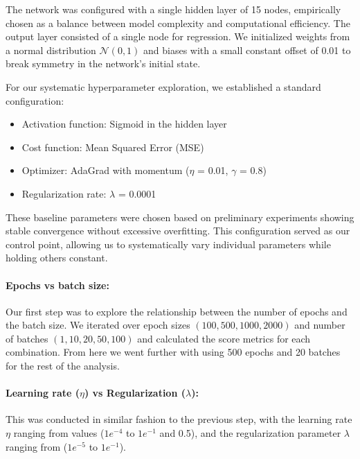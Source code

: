 The network was configured with a single hidden layer of 15 nodes, empirically chosen as a balance between model complexity and computational efficiency. The output layer consisted of a single node for regression. We initialized weights from a normal distribution \( \mathcal{N} (0,1) \) and biases with a small constant offset of 0.01 to break symmetry in the network's initial state.

For our systematic hyperparameter exploration, we established a standard configuration:
\begin{itemize}
    \item Activation function: Sigmoid in the hidden layer
    \item Cost function: Mean Squared Error (MSE)
    \item Optimizer: AdaGrad with momentum (\( \eta \) = 0.01, \( \gamma \) = 0.8)
    \item Regularization rate: \( \lambda \) = 0.0001
\end{itemize}

These baseline parameters were chosen based on preliminary experiments showing stable convergence without excessive overfitting. This configuration served as our control point, allowing us to systematically vary individual parameters while holding others constant.

\paragraph*{Epochs vs batch size:}
Our first step was to explore the relationship between the number of epochs and the batch size. We iterated over epoch sizes \( (100, 500, 1000, 2000) \) and number of batches \( (1, 10, 20, 50, 100) \) and calculated the score metrics for each combination. From here we went further with using 500 epochs and 20 batches for the rest of the analysis.

\paragraph*{Learning rate (\( \eta \)) vs Regularization (\( \lambda \)):}
This was conducted in similar fashion to the previous step, with the learning rate \( \eta \) ranging from values (\( 1e^{-4} \) to \( 1e^{-1} \) and 0.5), and the regularization parameter \( \lambda \) ranging from (\( 1e^{-5} \) to \( 1e^{-1} \)).

